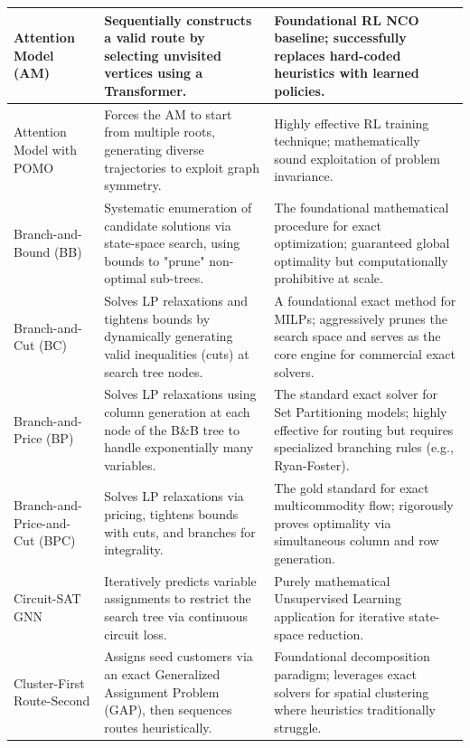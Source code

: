 \begin{center}
\begin{longtable}{
  >{\raggedright\arraybackslash}p{}
  >{\raggedright\arraybackslash}p{}
  >{\raggedright\arraybackslash}p{}
}
Attention Model (AM) & Sequentially constructs a valid route by selecting unvisited vertices using a Transformer. & Foundational RL NCO baseline; successfully replaces hard-coded heuristics with learned policies. \\ \midrule

Attention Model with POMO & Forces the AM to start from multiple roots, generating diverse trajectories to exploit graph symmetry. & Highly effective RL training technique; mathematically sound exploitation of problem invariance. \\ \midrule

Branch-and-Bound (BB) & Systematic enumeration of candidate solutions via state-space search, using bounds to "prune" non-optimal sub-trees. & The foundational mathematical procedure for exact optimization; guaranteed global optimality but computationally prohibitive at scale. \\ \midrule

Branch-and-Cut (BC) & Solves LP relaxations and tightens bounds by dynamically generating valid inequalities (cuts) at search tree nodes. & A foundational exact method for MILPs; aggressively prunes the search space and serves as the core engine for commercial exact solvers. \\ \midrule

Branch-and-Price (BP) & Solves LP relaxations using column generation at each node of the B\&B tree to handle exponentially many variables. & The standard exact solver for Set Partitioning models; highly effective for routing but requires specialized branching rules (e.g., Ryan-Foster). \\ \midrule

Branch-and-Price-and-Cut (BPC) & Solves LP relaxations via pricing, tightens bounds with cuts, and branches for integrality. & The gold standard for exact multicommodity flow; rigorously proves optimality via simultaneous column and row generation. \\ \midrule

Circuit-SAT GNN & Iteratively predicts variable assignments to restrict the search tree via continuous circuit loss. & Purely mathematical Unsupervised Learning application for iterative state-space reduction. \\ \midrule

Cluster-First Route-Second & Assigns seed customers via an exact Generalized Assignment Problem (GAP), then sequences routes heuristically. & Foundational decomposition paradigm; leverages exact solvers for spatial clustering where heuristics traditionally struggle. \\ \midrule


\end{longtable}
\end{center}
